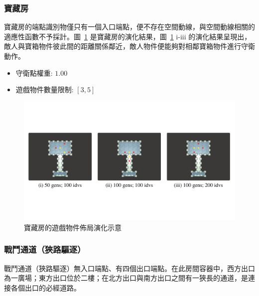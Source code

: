 \subsubsection{寶藏房}
\label{sssec:method-segments-appliedonvolumes-treasure}

寶藏房的端點識別物僅只有一個入口端點，便不存在空間動線，與空間動線相關的適應性函數不予採計。圖~\ref{fig:applied-ga-on-volume-treasure} 是寶藏房的演化結果，圖~\ref{fig:applied-ga-on-volume-treasure} i-iii 的演化結果呈現出，敵人與寶箱物件彼此間的距離關係鄰近，敵人物件便能夠對相鄰寶箱物件進行守衛動作。

\begin{itemize}
  \setlength\itemsep{-0.5em}
  \item 守衛點權重: $1.00$
  \item 遊戲物件數量限制: $[3, 5]$
\end{itemize}

\begin{figure}[H]
  \begin{center}
    \includegraphics[width=1.0\textwidth]{figures/applied-ga-on-volume-treasure.pdf}
    \caption{寶藏房的遊戲物件佈局演化示意} 
    \label{fig:applied-ga-on-volume-treasure}
  \end{center}
\end{figure}

\subsubsection{戰鬥通道（狹路驅逐）}
\label{sssec:method-segments-appliedonvolumes-battlepath-narrow}

戰鬥通道（狹路驅逐）無入口端點、有四個出口端點。在此房間容器中，西方出口為一廣場；東方出口位於二樓；在北方出口與南方出口之間有一狹長的通道，是連接各個出口的必經道路。

